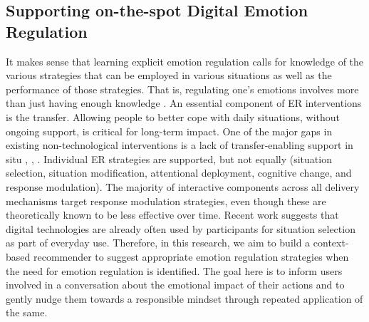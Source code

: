 \subsection{Supporting on-the-spot Digital Emotion Regulation}
It makes sense that learning explicit emotion regulation calls for knowledge of the various strategies that can be employed in various situations as well as the performance of those strategies. That is, regulating one's emotions involves more than just having enough knowledge \cite{slovak2022designing}. An essential component of ER interventions is the transfer. Allowing people to better cope with daily situations, without ongoing support, is critical for long-term impact. One of the major gaps in existing non-technological interventions is a lack of transfer-enabling support in situ \cite{slovak2016scaffolding}, \cite{antle2018opening}, \cite{antle2019design}. Individual ER strategies are supported, but not equally (situation selection, situation modification, attentional deployment, cognitive change, and response modulation). The majority of interactive components across all delivery mechanisms target response modulation strategies, even though these are theoretically known to be less effective over time. Recent work suggests that digital technologies are already often used by participants for situation selection as part of everyday use. Therefore, in this research, we aim to build a context-based recommender to suggest appropriate emotion regulation strategies when the need for emotion regulation is identified. The goal here is to inform users involved in a conversation about the emotional impact of their actions and to gently nudge them towards a responsible mindset through repeated application of the same.

